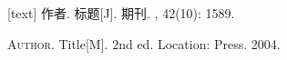 \documentclass{ctexbeamer}
\begin{document}
\begin{frame}
  \begin{thebibliography}{00}
    [text]
     作者.
    \newblock 标题[J].
    \newblock 期刊.
    , 42(10): 1589.
  \end{thebibliography}
  \begin{bibliolist}{00}
    \bookitem \textsc{Author}.
    \newblock Title[M].
    \newblock\newblock 2nd ed. Location: Press. 2004.
  \end{bibliolist}
\end{frame}
\end{document}

